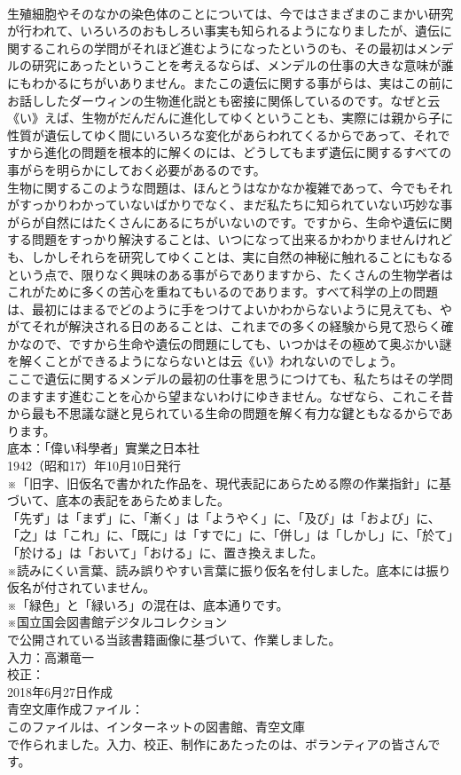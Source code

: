 \documentclass[8pt]{extreport}
\begin{document}
\begin{CJK}{UTF8}{min}
\\	生殖細胞やそのなかの染色体のことについては、今ではさまざまのこまかい研究が行われて、いろいろのおもしろい事実も知られるようになりましたが、遺伝に関するこれらの学問がそれほど進むようになったというのも、その最初はメンデルの研究にあったということを考えるならば、メンデルの仕事の大きな意味が誰にもわかるにちがいありません。またこの遺伝に関する事がらは、実はこの前にお話ししたダーウィンの生物進化説とも密接に関係しているのです。なぜと云《い》えば、生物がだんだんに進化してゆくということも、実際には親から子に性質が遺伝してゆく間にいろいろな変化があらわれてくるからであって、それですから進化の問題を根本的に解くのには、どうしてもまず遺伝に関するすべての事がらを明らかにしておく必要があるのです。
\\	生物に関するこのような問題は、ほんとうはなかなか複雑であって、今でもそれがすっかりわかっていないばかりでなく、まだ私たちに知られていない巧妙な事がらが自然にはたくさんにあるにちがいないのです。ですから、生命や遺伝に関する問題をすっかり解決することは、いつになって出来るかわかりませんけれども、しかしそれらを研究してゆくことは、実に自然の神秘に触れることにもなるという点で、限りなく興味のある事がらでありますから、たくさんの生物学者はこれがために多くの苦心を重ねてもいるのであります。すべて科学の上の問題は、最初にはまるでどのように手をつけてよいかわからないように見えても、やがてそれが解決される日のあることは、これまでの多くの経験から見て恐らく確かなので、ですから生命や遺伝の問題にしても、いつかはその極めて奥ぶかい謎を解くことができるようにならないとは云《い》われないのでしょう。
\\	ここで遺伝に関するメンデルの最初の仕事を思うにつけても、私たちはその学問のますます進むことを心から望まないわけにゆきません。なぜなら、これこそ昔から最も不思議な謎と見られている生命の問題を解く有力な鍵ともなるからであります。
\\	底本：「偉い科學者」實業之日本社
\\	1942（昭和17）年10月10日発行
\\	※「旧字、旧仮名で書かれた作品を、現代表記にあらためる際の作業指針」に基づいて、底本の表記をあらためました。
\\	「先ず」は「まず」に、「漸く」は「ようやく」に、「及び」は「および」に、「之」は「これ」に、「既に」は「すでに」に、「併し」は「しかし」に、「於て」「於ける」は「おいて」「おける」に、置き換えました。
\\	※読みにくい言葉、読み誤りやすい言葉に振り仮名を付しました。底本には振り仮名が付されていません。
\\	※「緑色」と「緑いろ」の混在は、底本通りです。
\\	※国立国会図書館デジタルコレクション
\\	で公開されている当該書籍画像に基づいて、作業しました。
\\	入力：高瀬竜一
\\	校正：
\\	2018年6月27日作成
\\	青空文庫作成ファイル：
\\	このファイルは、インターネットの図書館、青空文庫
\\	で作られました。入力、校正、制作にあたったのは、ボランティアの皆さんです。
\end{CJK}
\end{document}
